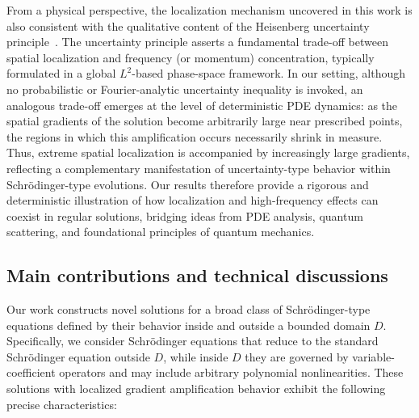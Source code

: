 \documentclass[11pt,reqno,oneside]{amsart}
\numberwithin{equation}{section}
\theoremstyle{definition}
\theoremstyle{remark}
\numberwithin{equation}{section}
\begin{document}
 	From a physical perspective, the localization mechanism uncovered in this work
 	is also consistent with the qualitative content of the Heisenberg uncertainty
 	principle~\cite{Heisenberg1927}. The uncertainty
 	principle asserts a fundamental trade-off between spatial localization and
 	frequency (or momentum) concentration, typically formulated in a global
 	\(L^2\)-based phase-space framework. In our setting, although no probabilistic
 	or Fourier-analytic uncertainty inequality is invoked, an analogous trade-off
 	emerges at the level of deterministic PDE dynamics: as the spatial gradients of
 	the solution become arbitrarily large near prescribed points, the regions in
 	which this amplification occurs necessarily shrink in measure. Thus, extreme
 	spatial localization is accompanied by increasingly large gradients, reflecting
 	a complementary manifestation of uncertainty-type behavior within
 	Schr\"odinger-type evolutions. Our results therefore provide a rigorous and
 	deterministic illustration of how localization and high-frequency effects can
 	coexist in regular solutions, bridging ideas from PDE analysis, quantum
 	scattering, and foundational principles of quantum mechanics.
 	
 	
	\subsection{Main contributions and technical discussions}\label{subsection 1.3}
	
	Our work constructs novel solutions for a broad class of Schr\"odinger-type equations defined by their behavior inside and outside a bounded domain $D$. Specifically, we consider Schr\"odinger equations that reduce to the standard Schr\"odinger equation outside $D$, while inside $D$ they are governed by variable-coefficient operators and may include arbitrary polynomial nonlinearities. These solutions with localized gradient amplification behavior exhibit the following precise characteristics:
	
\end{document}
